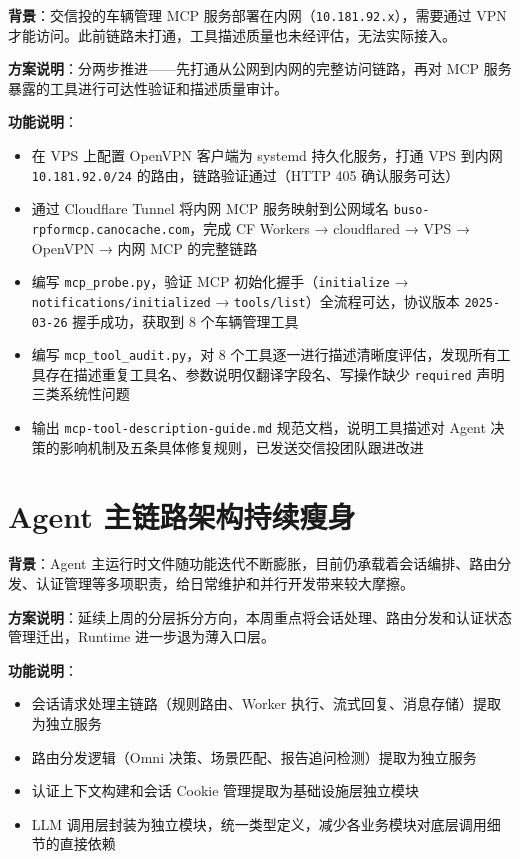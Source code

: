 \documentclass[UTF8]{ctexart}
\begin{document}
\textbf{背景}：交信投的车辆管理 MCP 服务部署在内网（\texttt{10.181.92.x}），需要通过 VPN 才能访问。此前链路未打通，工具描述质量也未经评估，无法实际接入。

\textbf{方案说明}：分两步推进——先打通从公网到内网的完整访问链路，再对 MCP 服务暴露的工具进行可达性验证和描述质量审计。

\textbf{功能说明}：
\begin{itemize}
\item 在 VPS 上配置 OpenVPN 客户端为 systemd 持久化服务，打通 VPS 到内网 \texttt{10.181.92.0/24} 的路由，链路验证通过（HTTP 405 确认服务可达）
\item 通过 Cloudflare Tunnel 将内网 MCP 服务映射到公网域名 \texttt{buso-rpformcp.canocache.com}，完成 CF Workers → cloudflared → VPS → OpenVPN → 内网 MCP 的完整链路
\item 编写 \texttt{mcp\_probe.py}，验证 MCP 初始化握手（\texttt{initialize} → \texttt{notifications/initialized} → \texttt{tools/list}）全流程可达，协议版本 \texttt{2025-03-26} 握手成功，获取到 8 个车辆管理工具
\item 编写 \texttt{mcp\_tool\_audit.py}，对 8 个工具逐一进行描述清晰度评估，发现所有工具存在描述重复工具名、参数说明仅翻译字段名、写操作缺少 \texttt{required} 声明三类系统性问题
\item 输出 \texttt{mcp-tool-description-guide.md} 规范文档，说明工具描述对 Agent 决策的影响机制及五条具体修复规则，已发送交信投团队跟进改进
\end{itemize}

\section{Agent 主链路架构持续瘦身}

\textbf{背景}：Agent 主运行时文件随功能迭代不断膨胀，目前仍承载着会话编排、路由分发、认证管理等多项职责，给日常维护和并行开发带来较大摩擦。

\textbf{方案说明}：延续上周的分层拆分方向，本周重点将会话处理、路由分发和认证状态管理迁出，Runtime 进一步退为薄入口层。

\textbf{功能说明}：
\begin{itemize}
\item 会话请求处理主链路（规则路由、Worker 执行、流式回复、消息存储）提取为独立服务
\item 路由分发逻辑（Omni 决策、场景匹配、报告追问检测）提取为独立服务
\item 认证上下文构建和会话 Cookie 管理提取为基础设施层独立模块
\item LLM 调用层封装为独立模块，统一类型定义，减少各业务模块对底层调用细节的直接依赖
\end{itemize}
\end{document}
